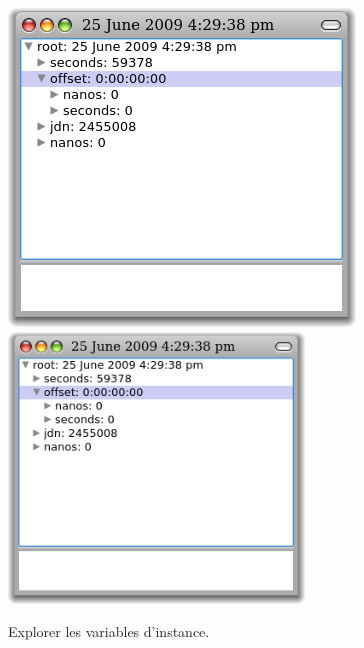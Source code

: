 \documentclass[a4paper,10pt,twoside]{book}
\begin{document}
\begin{figure}[tbp]
\begin{minipage}{0.48\textwidth}
\begin{center}
		{\includegraphics[width=\textwidth]{exploreTimeStampNow2}}
		{\includegraphics[width=0.7\textwidth]{exploreTimeStampNow2}}
	\end{center}
	\caption{Explorer les variables d'instance.}
\end{minipage}
\end{figure}
\end{document}
